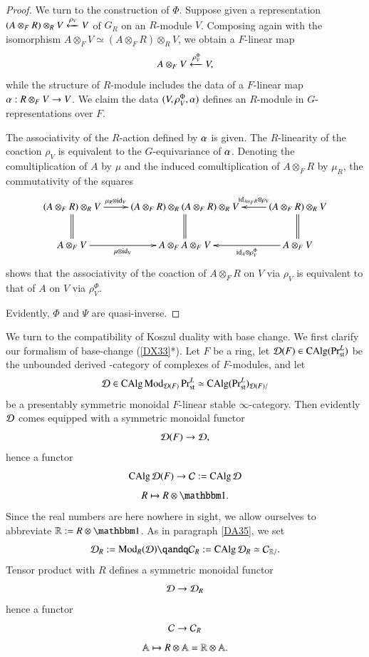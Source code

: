 \begin{proof}
We turn to the construction of $\Phi$. Suppose given a representation $(A \otimes_F R) \otimes_R V \xleftarrow{\rho_V} V$ of $G_R$ on an $R$-module $V$. Composing again with the isomorphism $A \otimes_F V \simeq (A \otimes_F R) \otimes_R V$, we obtain a $F$-linear map
\[
A \otimes_F V \xleftarrow{\rho_V^\Phi} V,
\]
while the structure of $R$-module includes the data of a $F$-linear map $\alpha: R\otimes_F V \to V$. We claim the data $(V, \rho_V^\Phi, \alpha)$ defines an $R$-module in $G$-representations over $F$. 

The associativity of the $R$-action defined by $\alpha$ is given. The $R$-linearity of the coaction $\rho_V$ is equivalent to the $G$-equivariance of $\alpha$. Denoting the comultiplication of $A$ by $\mu$ and the induced comultiplication of $A \otimes_F R$ by $\mu_R$, the commutativity of the squares
\[
\xymatrix{
(A \otimes_F R) \otimes_R V
\ar@{=}[d] \ar[r]^-{\mu_R \otimes \m{id}_V}
&
(A\otimes_F R)\otimes_R(A\otimes_FR)\otimes_R V
\ar@{=}[d]
&
(A \otimes_F R) \otimes_R V
\ar@{=}[d] \ar[l]_-{\m{id}_{A\otimes_F R} \otimes \rho_V}
\\
A \otimes_F V
\ar[r]_-{\mu \otimes \m{id}_V}
&
A \otimes_F A\otimes_F V
&
A \otimes_F V
\ar[l]^-{\m{id}_A \otimes \rho_V^\Phi}
}
\]
shows that the associativity of the coaction of $A\otimes_F R$ on $V$ via $\rho_V$ is equivalent to that of $A$ on $V$ via $\rho_V^\Phi$.

Evidently, $\Phi$ and $\Psi$ are quasi-inverse.
\end{proof}


\sspar{}\label{IA55}
We turn to the compatibility of Koszul duality with base change. We first clarify our formalism of base-change (\ref{DX33}*). Let $F$ be a ring, let $\mathcal{D}(F) \in \operatorname{CAlg} (\mathrm{Pr}^L_{\mathrm{st}})$ be the unbounded derived \oo-category of complexes of $F$-modules, and let
\[
\mathcal{D} \in \operatorname{CAlg} \operatorname{Mod}_{\mathcal{D}(F)} \mathrm{Pr}^L_{\mathrm{st}}
\simeq
\operatorname{CAlg} (\mathrm{Pr}^L_{\mathrm{st}})_{\mathcal{D}(F)/}
\]
be a presentably symmetric monoidal $F$-linear stable $\infty$-category. Then evidently $\mathcal{D}$ comes equipped with a symmetric monoidal functor 
\[
\mathcal{D}(F) \to \mathcal{D},
\]
hence a functor 
\[
\operatorname{CAlg} \mathcal{D}(F) \to \mathcal{C} := \operatorname{CAlg} \mathcal{D}
\]
\[
R \mapsto R \otimes \one.
\]
Since the real numbers are here nowhere in sight, we allow ourselves to abbreviate $\RR:= R \otimes \one$. As in paragraph \ref{DA35}, we set
\[
\Dd_R := \Mod_R(\Dd)
\qandq
\Cc_R := \CAlg \Dd_R \simeq \Cc_{\RR/}.
\]
Tensor product with $R$ defines a symmetric monoidal functor 
\[
\mathcal{D} \to \mathcal{D}_R
\]
hence a functor
\[
\mathcal{C} \to \mathcal{C}_R
\]
\[
\mathbb{A} \mapsto R \otimes \mathbb{A} = \mathbb{R} \otimes \mathbb{A}.
\]


